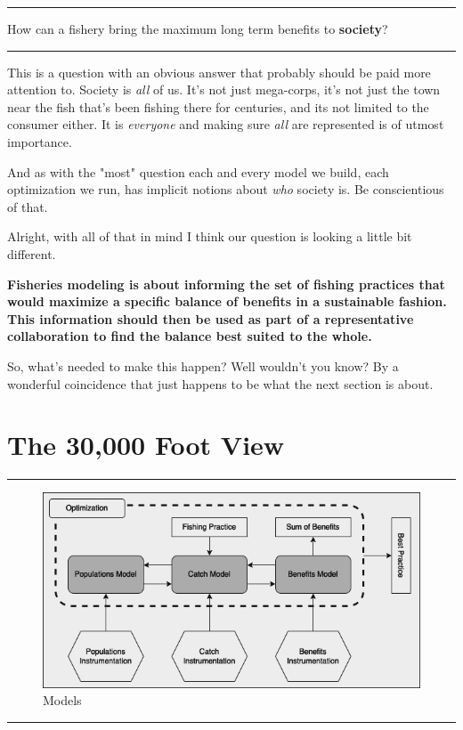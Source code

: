 \documentclass[11pt,a5paper]{book}
\begin{document}
\noindent \rule{\textwidth}{0.5pt} 
\noindent  How can a fishery bring the maximum long term benefits to \textbf{society}?
\newline
\rule{\textwidth}{0.5pt} 
\vspace{5pt}

This is a question with an obvious answer that probably should be paid more attention to. Society is \textit{all} of us. It's not just mega-corps, it's not just the town near the fish that's been fishing there for centuries, and its not limited to the consumer either. It is \textit{everyone} and making sure \textit{all} are represented is of utmost importance. 
\newline

And as with the "most" question each and every model we build, each optimization we run, has implicit notions about \textit{who} society is. Be conscientious of that. 
\newpage

Alright, with all of that in mind I think our question is looking a little bit different. 
\newline

 \hangindent=1cm \noindent \textbf{Fisheries modeling is about informing the set of fishing practices that would maximize a specific balance of benefits in a sustainable fashion. This information should then be used as part of a representative collaboration to find the balance best suited to the whole.}
\newline

So, what's needed to make this happen? Well wouldn't you know? By a wonderful coincidence that just happens to be what the next section is about. 
\newpage

\chapter{The 30,000 Foot View}

\noindent \rule{\textwidth}{0.5pt} 
\begin{figure}[h!] 
  \includegraphics[width=\linewidth]{drawings/high_level_models.png}
  \caption{Models}
  \label{fig:high_level_models}
\end{figure}
\newline
\rule{\textwidth}{0.5pt} 
\vspace{5pt}
\end{document}
